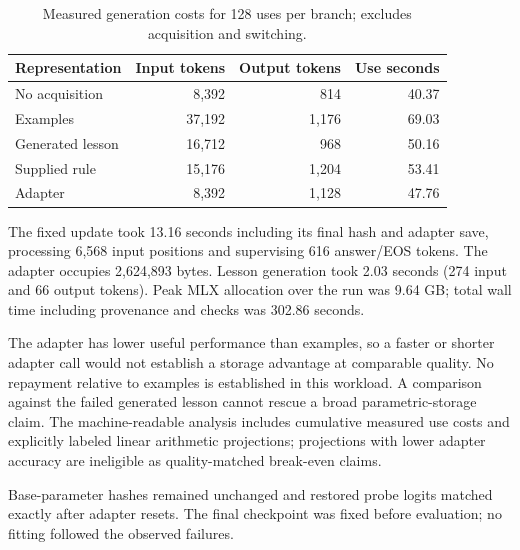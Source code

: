 \begin{table}[H]

\centering

\begin{tabular}{lrrr}

\toprule

Representation & Input tokens & Output tokens & Use seconds \\

\midrule

No acquisition & 8,392 & 814 & 40.37 \\

Examples & 37,192 & 1,176 & 69.03 \\

Generated lesson & 16,712 & 968 & 50.16 \\

Supplied rule & 15,176 & 1,204 & 53.41 \\

Adapter & 8,392 & 1,128 & 47.76 \\

\bottomrule

\end{tabular}

\caption{Measured generation costs for 128 uses per branch; excludes acquisition and switching.}

\end{table}

The fixed update took 13.16 seconds including its final hash and adapter save, processing 6,568 input positions and supervising 616 answer/EOS tokens. The adapter occupies 2,624,893 bytes. Lesson generation took 2.03 seconds (274 input and 66 output tokens). Peak MLX allocation over the run was 9.64 GB; total wall time including provenance and checks was 302.86 seconds.

The adapter has lower useful performance than examples, so a faster or shorter adapter call would not establish a storage advantage at comparable quality. No repayment relative to examples is established in this workload. A comparison against the failed generated lesson cannot rescue a broad parametric-storage claim. The machine-readable analysis includes cumulative measured use costs and explicitly labeled linear arithmetic projections; projections with lower adapter accuracy are ineligible as quality-matched break-even claims.

Base-parameter hashes remained unchanged and restored probe logits matched exactly after adapter resets. The final checkpoint was fixed before evaluation; no fitting followed the observed failures.
